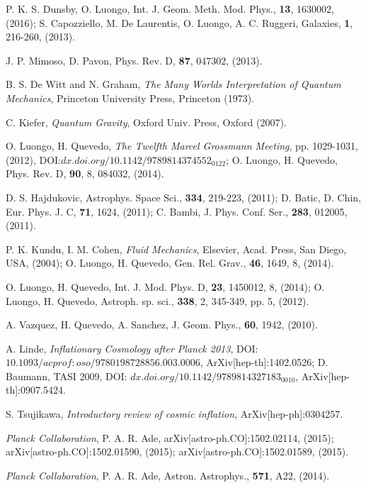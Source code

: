 \documentclass[nofootinbib,prd,superscriptaddress,showpacs,showkeys,]{revtex4}
\begin{document}
\begin{thebibliography}{99}
P. K. S. Dunsby, O. Luongo, Int. J. Geom. Meth. Mod. Phys., {\bf 13}, 1630002, (2016); S. Capozziello, M. De Laurentis, O. Luongo, A. C. Ruggeri, Galaxies, {\bf 1}, 216-260, (2013).

J. P. Mimoso, D. Pavon, Phys. Rev. D, {\bf 87}, 047302, (2013).

B. S. De Witt and N. Graham, \textit{The Many Worlds Interpretation of Quantum Mechanics}, Princeton University Press, Princeton (1973).


C. Kiefer, {\it Quantum Gravity},  Oxford Univ. Press, Oxford (2007).


O. Luongo, H. Quevedo, \emph{The Twelfth Marcel Grossmann Meeting}, pp. 1029-1031, (2012), DOI:$dx.doi.org/10.1142/9789814374552_0122$; O. Luongo, H. Quevedo, Phys. Rev. D, {\bf 90}, 8, 084032, (2014).


D. S. Hajdukovic, Astrophys. Space Sci., {\bf 334}, 219-223, (2011); D. Batic, D. Chin, Eur. Phys. J. C, {\bf 71}, 1624, (2011); C. Bambi, J. Phys. Conf. Ser., {\bf 283}, 012005, (2011).

P. K. Kundu, I. M. Cohen, \emph{Fluid Mechanics}, Elsevier, Acad. Press, San Diego, USA, (2004); O. Luongo, H. Quevedo, Gen. Rel. Grav., {\bf 46}, 1649, 8, (2014).

O. Luongo, H. Quevedo, Int. J. Mod. Phys. D, {\bf 23}, 1450012, 8, (2014); O. Luongo, H. Quevedo, Astroph. sp. sci., {\bf 338}, 2, 345-349, pp. 5, (2012).

A. Vazquez, H. Quevedo, A. Sanchez, J. Geom. Phys., {\bf 60}, 1942, (2010).

A. Linde, \emph{Inflationary Cosmology after Planck 2013}, DOI:$10.1093/acprof:oso/9780198728856.003.0006$, ArXiv[hep-th]:1402.0526; D. Baumann, TASI 2009, DOI: $dx.doi.org/10.1142/9789814327183_0010$, ArXiv[hep-th]:0907.5424.

S. Tsujikawa, \emph{Introductory review of cosmic inflation}, ArXiv[hep-ph]:0304257.


\emph{Planck Collaboration}, P. A. R. Ade, arXiv[astro-ph.CO]:1502.02114, (2015); arXiv[astro-ph.CO]:1502.01590, (2015); arXiv[astro-ph.CO]:1502.01589, (2015).

\emph{Planck Collaboration}, P. A. R. Ade, Astron. Astrophys., {\bf 571}, A22, (2014).




\end{thebibliography}
\end{document}
